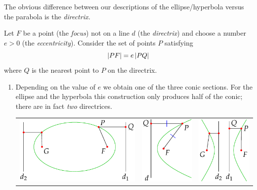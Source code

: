 
The obvious difference between our descriptions of the ellipse/hyperbola versus the parabola is the \emph{directrix.}

\begin{thm}{}{}
Let $F$ be a point (the \emph{focus}) not on a line $d$ (the \emph{directrix}) and choose a number $e>0$ (the \emph{eccentricity}). Consider the set of points $P$ satisfying
\[\left| PF\right|=e\left| PQ\right|\]
where $Q$ is the nearest point to $P$ on the directrix.
\begin{enumerate}
  \item Depending on the value of $e$ we obtain one of the three conic sections. For the ellipse and the hyperbola this construction only produces half of the conic; there are in fact \emph{two} directrices.
	\begin{center}
		\begin{tabular}{c@{\qquad}c@{\qquad\qquad}c}
		\includegraphics{eccentricity2}
		&
		\includegraphics{eccentricity}
		&
		\includegraphics{eccentricity3}

\end{tabular}
\end{center}
\end{enumerate}
\end{thm}
